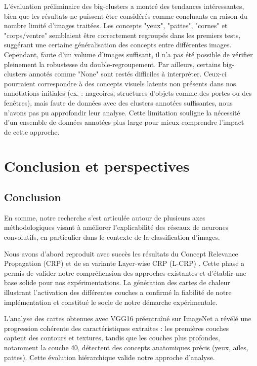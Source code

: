 \documentclass[runningheads]{llncs}
\begin{document}
\indent L’évaluation préliminaire des big-clusters a montré des tendances intéressantes, bien que les résultats ne puissent être considérés comme concluants en raison du nombre limité d’images traitées. Les concepts "yeux", "pattes", "cornes" et "corps/ventre" semblaient être correctement regroupés dans les premiers tests, suggérant une certaine généralisation des concepts entre différentes images. Cependant, faute d’un volume d’images suffisant, il n’a pas été possible de vérifier pleinement la robustesse du double-regroupement. Par ailleurs, certains big-clusters annotés comme "None" sont restés difficiles à interpréter. Ceux-ci pourraient correspondre à des concepts visuels latents non présents dans nos annotations initiales (ex. : nageoires, structures d’objets comme des portes ou des fenêtres), mais faute de données avec des clusters annotées suffisantes, nous n’avons pas pu approfondir leur analyse. Cette limitation souligne la nécessité d’un ensemble de données annotées plus large pour mieux comprendre l’impact de cette approche.

\section{Conclusion et perspectives}

\subsection{Conclusion}

En somme, notre recherche s'est articulée autour de plusieurs axes méthodologiques visant à améliorer l'explicabilité des réseaux de neurones convolutifs, en particulier dans le contexte de la classification d'images.

Nous avons d'abord reproduit avec succès les résultats du Concept Relevance Propagation (CRP) \autocite{Achtibat2023} et de sa variante Layer-wise CRP (L-CRP) \autocite{inproceedings}. Cette phase a permis de valider notre compréhension des approches existantes et d'établir une base solide pour nos expérimentations. La génération des cartes de chaleur illustrant l'activation des différentes couches a confirmé la fiabilité de notre implémentation et constitué le socle de notre démarche expérimentale.

L'analyse des cartes obtenues avec VGG16 préentraîné sur ImageNet a révélé une progression cohérente des caractéristiques extraites : les premières couches captent des contours et textures, tandis que les couches plus profondes, notamment la couche 40, détectent des concepts anatomiques précis (yeux, ailes, pattes). Cette évolution hiérarchique valide notre approche d'analyse.
\end{document}

